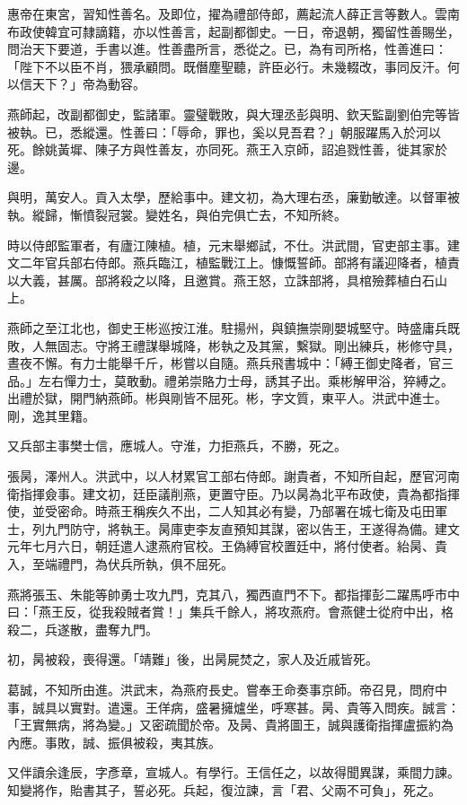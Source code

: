 \begin{pinyinscope}
惠帝在東宮，習知性善名。及即位，擢為禮部侍郎，薦起流人薛正言等數人。雲南布政使韓宜可隸謫籍，亦以性善言，起副都御史。一日，帝退朝，獨留性善賜坐，問治天下要道，手書以進。性善盡所言，悉從之。已，為有司所格，性善進曰：「陛下不以臣不肖，猥承顧問。既僭塵聖聽，許臣必行。未幾輟改，事同反汗。何以信天下？」帝為動容。

燕師起，改副都御史，監諸軍。靈璧戰敗，與大理丞彭與明、欽天監副劉伯完等皆被執。已，悉縱還。性善曰：「辱命，罪也，奚以見吾君？」朝服躍馬入於河以死。餘姚黃墀、陳子方與性善友，亦同死。燕王入京師，詔追戮性善，徙其家於邊。

與明，萬安人。貢入太學，歷給事中。建文初，為大理右丞，廉勤敏達。以督軍被執。縱歸，慚憤裂冠裳。變姓名，與伯完俱亡去，不知所終。

時以侍郎監軍者，有廬江陳植。植，元末舉鄉試，不仕。洪武間，官吏部主事。建文二年官兵部右侍郎。燕兵臨江，植監戰江上。慷慨誓師。部將有議迎降者，植責以大義，甚厲。部將殺之以降，且邀賞。燕王怒，立誅部將，具棺殮葬植白石山上。

燕師之至江北也，御史王彬巡按江淮。駐揚州，與鎮撫崇剛嬰城堅守。時盛庸兵既敗，人無固志。守將王禮謀舉城降，彬執之及其黨，繫獄。剛出練兵，彬修守具，晝夜不懈。有力士能舉千斤，彬嘗以自隨。燕兵飛書城中：「縛王御史降者，官三品。」左右憚力士，莫敢動。禮弟崇賂力士母，誘其子出。乘彬解甲浴，猝縛之。出禮於獄，開門納燕師。彬與剛皆不屈死。彬，字文質，東平人。洪武中進士。剛，逸其里籍。

又兵部主事樊士信，應城人。守淮，力拒燕兵，不勝，死之。

張昺，澤州人。洪武中，以人材累官工部右侍郎。謝貴者，不知所自起，歷官河南衛指揮僉事。建文初，廷臣議削燕，更置守臣。乃以昺為北平布政使，貴為都指揮使，並受密命。時燕王稱疾久不出，二人知其必有變，乃部署在城七衛及屯田軍士，列九門防守，將執王。昺庫吏李友直預知其謀，密以告王，王遂得為備。建文元年七月六日，朝廷遣人逮燕府官校。王偽縛官校置廷中，將付使者。紿昺、貴入，至端禮門，為伏兵所執，俱不屈死。

燕將張玉、朱能等帥勇士攻九門，克其八，獨西直門不下。都指揮彭二躍馬呼市中曰：「燕王反，從我殺賊者賞！」集兵千餘人，將攻燕府。會燕健士從府中出，格殺二，兵遂散，盡奪九門。

初，昺被殺，喪得還。「靖難」後，出昺屍焚之，家人及近戚皆死。

葛誠，不知所由進。洪武末，為燕府長史。嘗奉王命奏事京師。帝召見，問府中事，誠具以實對。遣還。王佯病，盛暑擁爐坐，呼寒甚。昺、貴等入問疾。誠言：「王實無病，將為變。」又密疏聞於帝。及昺、貴將圖王，誠與護衛指揮盧振約為內應。事敗，誠、振俱被殺，夷其族。

又伴讀余逢辰，字彥章，宣城人。有學行。王信任之，以故得聞異謀，乘間力諫。知變將作，貽書其子，誓必死。兵起，復泣諫，言「君、父兩不可負」，死之。


\end{pinyinscope}
